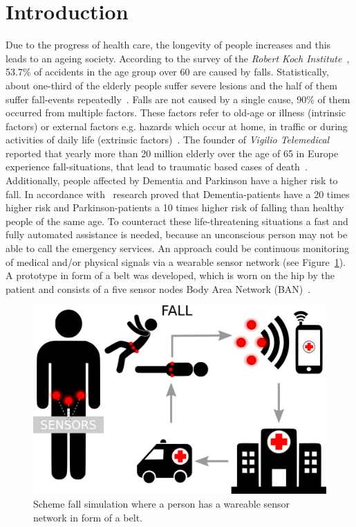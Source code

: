 \documentclass[review]{elsarticle}
\begin{document}
\section{Introduction}

Due to the progress of health care, the longevity of people increases and this leads to an ageing society. %
According to the survey of the \textit{Robert Koch Institute}~\cite{Varnaccia2013}, 53.7\% of accidents in the age 
group over 60 are caused by falls. Statistically, about one-third of the elderly people suffer severe lesions and the half of them suffer 
fall-events repeatedly~\cite{Schott2008}. Falls are not caused by a single cause, 90\% of them occurred from multiple factors. These 
factors refer to old-age or illness (intrinsic factors) or external factors e.g. hazards which occur at home, in traffic or during activities 
of daily life (extrinsic factors)~\cite{Schott2008}. The founder of \textit{Vigilio Telemedical} reported that yearly more than 20 million 
elderly over the age of 65 in Europe experience fall-situations, that lead to traumatic based cases of death~\cite{Vigilio,APAOTS2013}. 
Additionally, people affected by Dementia and Parkinson have a higher risk to fall. In accordance with~\cite{Monks} research proved that 
Dementia-patients have a 20 times higher risk and Parkinson-patients a 10 times higher risk of falling than healthy people of the same age. 
To counteract these life-threatening situations a fast and fully automated assistance is needed, because an unconscious person may not be 
able to call the emergency services. An approach could be continuous monitoring of medical and/or physical signals via a wearable sensor 
network (see Figure~\ref{fig:escalationscheme}). A prototype in form of a belt was developed, which is worn on the hip by the patient and consists 
of a five sensor nodes Body Area Network (BAN)~\cite{LaBlunda.2016,LaBlunda.2016b}. 

\begin{figure}[!ht]
  \centering
  \includegraphics[scale=0.15]{img/Figure1}
  \caption[Escalation scheme]{Scheme fall simulation where a person has a wareable sensor network in form of a belt.~\cite{LaBlunda.2016,LaBlunda.2016b}}
  \label{fig:escalationscheme}
\end{figure}
\end{document}
